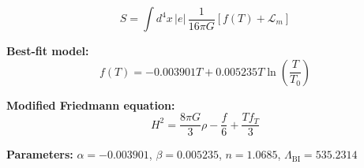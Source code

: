 
\begin{equation}
  S = \int d^4x \, |e| \, \frac{1}{16\pi G} \left[ f(T) + \mathcal{L}_m \right]
\end{equation}

\textbf{Best-fit model:}
\begin{equation}
  f(T) = -0.003901 T + 0.005235 T \ln\!\left(\frac{T}{T_0}\right)
\end{equation}

\textbf{Modified Friedmann equation:}
\begin{equation}
  H^2 = \frac{8\pi G}{3} \rho - \frac{f}{6} + \frac{T f_T}{3}
\end{equation}

\textbf{Parameters:}
$\alpha = -0.003901$, \quad
$\beta = 0.005235$, \quad
$n = 1.0685$, \quad
$\Lambda_{\text{BI}} = 535.2314$